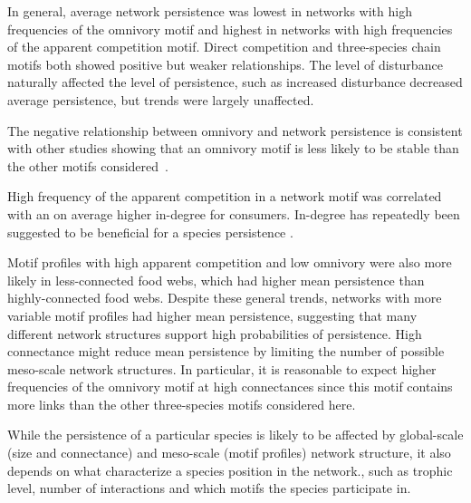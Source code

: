 \documentclass[12pt]{article}
\begin{document}
\begin{spacing}{2.0}
 In general, average network persistence was lowest in networks with high frequencies of the omnivory motif and highest in networks with high frequencies of the apparent competition motif. Direct competition and three-species chain motifs both showed positive but weaker relationships. The level of disturbance naturally affected the level of persistence, such as increased disturbance decreased average persistence, but trends were largely unaffected.

The negative relationship between omnivory and network persistence is consistent with other studies showing that an omnivory motif is less likely to be stable than the other motifs considered~\citep{Borrelli2015a}.

High frequency of the apparent competition in a network motif was correlated with an on average higher in-degree for consumers. In-degree has repeatedly been suggested to be beneficial for a species persistence  \citep{}.

Motif profiles with high apparent competition and low omnivory were also more likely in less-connected food webs, which had higher mean persistence than highly-connected food webs.
Despite these general trends, networks with more variable motif profiles had higher mean persistence, suggesting that many different network structures support high probabilities of persistence. 
High connectance might reduce mean persistence by limiting the number of possible meso-scale network structures.
In particular, it is reasonable to expect higher frequencies of the omnivory motif at high connectances since this motif contains more links than the other three-species motifs considered here.


While the persistence of a particular species is likely to be affected by global-scale (size and connectance) and meso-scale (motif profiles) network structure, it also depends on what characterize a species position in the network., such as trophic level, number of interactions and which motifs the species participate in.  


\end{spacing}
\end{document}

